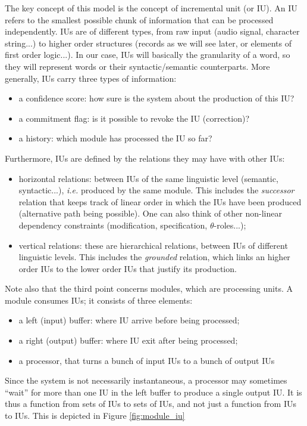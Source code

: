 \documentclass[11pt]{article}
\begin{document}
			The key concept of this model is the concept of incremental unit (or IU). An IU refers to the smallest possible chunk of information that can be processed independently. IUs are of different types, from raw input (audio signal, character string...) to higher order structures (records as we will see later, or elements of first order logic...). In our case, IUs will basically the granularity of a word, so they will represent words or their syntactic/semantic counterparts. More generally, IUs carry three types of information:
			\begin{itemize}
				\item a confidence score: how sure is the system about the production of this IU?
				\item a commitment flag: is it possible to revoke the IU (correction)?
				\item a history: which module has processed the IU so far?
			\end{itemize}
			Furthermore, IUs are defined by the relations they may have with other IUs:
			\begin{itemize}
				\item horizontal relations: between IUs of the same linguistic level (semantic, syntactic...), \textit{i.e.} produced by the same module. This includes the \textit{successor} relation that keeps track of linear order in which the IUs have been produced (alternative path being possible). One can also think of other non-linear dependency constraints (modification, specification, $\theta$-roles...);
				\item vertical relations: these are hierarchical relations, between IUs of different linguistic levels. This includes the \textit{grounded} relation, which links an higher order IUs to the lower order IUs that justify its production.
			\end{itemize}
			Note also that the third point concerns modules, which are processing units. A module consumes IUs; it consists of three elements:
			\begin{itemize}
				\item a left (input) buffer: where IU arrive before being processed;
				\item a right (output) buffer: where IU exit after being processed;
				\item a processor, that turns a bunch of input IUs to a bunch of output IUs
			\end{itemize}
			Since the system is not necessarily instantaneous, a processor may sometimes ``wait'' for more than one IU in the left buffer to produce a single output IU. It is thus a function from sets of IUs to sets of IUs, and not just a function from IUs to IUs. This is depicted in Figure \ref{fig:module_iu}\\
			
\end{document}
